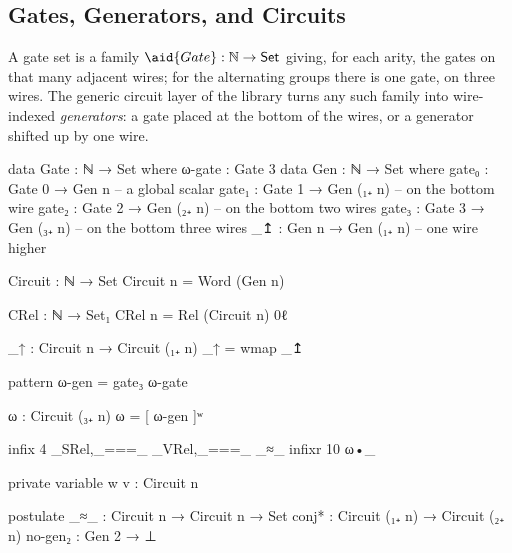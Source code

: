 \subsection{Gates, Generators, and Circuits}\label{sec:case-gates}

A gate set is a family $\aid{Gate} : \mathbb{N} \to \mathsf{Set}$ giving, for each arity, the gates on that many adjacent wires; for the alternating groups there is one gate, on three wires. The generic circuit layer of the library turns any such family into wire-indexed \emph{generators}: a gate placed at the bottom of the wires, or a generator shifted up by one wire.
\begin{center}
\begin{minipage}[c]{0.8\linewidth}
\begingroup\setlength{\mathindent}{0pt}
\begin{code}
data Gate : ℕ → Set where
  ω-gate : Gate 3
data Gen : ℕ → Set where
  gate₀ : Gate 0 → Gen n          -- a global scalar
  gate₁ : Gate 1 → Gen (₁₊ n)     -- on the bottom wire
  gate₂ : Gate 2 → Gen (₂₊ n)     -- on the bottom two wires
  gate₃ : Gate 3 → Gen (₃₊ n)     -- on the bottom three wires
  _↥   : Gen n → Gen (₁₊ n)       -- one wire higher
\end{code}
\endgroup
\end{minipage}\hfill%
\begin{minipage}[c]{0.16\linewidth}\centering\small

\end{minipage}
\end{center}
\begin{code}[hide]
Circuit : ℕ → Set
Circuit n = Word (Gen n)

CRel : ℕ → Set₁
CRel n = Rel (Circuit n) 0ℓ

_↑ : Circuit n → Circuit (₁₊ n)
_↑ = wmap _↥

pattern ω-gen = gate₃ ω-gate

ω : Circuit (₃₊ n)
ω = [ ω-gen ]ʷ

infix 4 _SRel,_===_ _VRel,_===_ _≈_
infixr 10 ω•_

private variable
  w v : Circuit n

postulate
  _≈_ : Circuit n → Circuit n → Set
  conj* : Circuit (₁₊ n) → Circuit (₂₊ n)
  no-gen₂ : Gen 2 → ⊥
\end{code}
